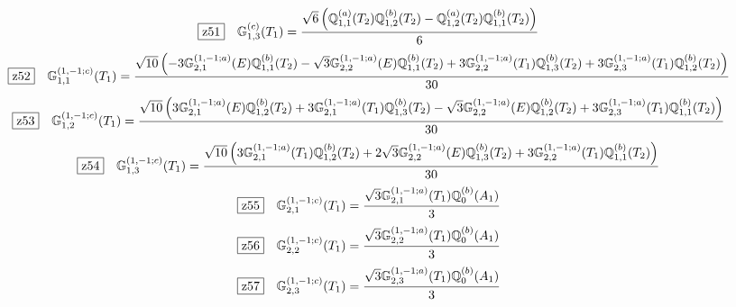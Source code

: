 \documentclass[fleqn,10pt,landscape]{jsarticle}
\begin{document}
\begin{dmath*}
\hspace*{3mm}\fbox{z51}\quad \mathbb{G}_{1,3}^{(c)}(T_{1})=\frac{\sqrt{6} \left(\mathbb{Q}_{1,1}^{(a)}(T_{2}) \mathbb{Q}_{1,2}^{(b)}(T_{2}) - \mathbb{Q}_{1,2}^{(a)}(T_{2}) \mathbb{Q}_{1,1}^{(b)}(T_{2})\right)}{6}
\end{dmath*}
\begin{dmath*}
\hspace*{3mm}\fbox{z52}\quad \mathbb{G}_{1,1}^{(1,-1;c)}(T_{1})=\frac{\sqrt{10} \left(- 3 \mathbb{G}_{2,1}^{(1,-1;a)}(E) \mathbb{Q}_{1,1}^{(b)}(T_{2}) - \sqrt{3} \mathbb{G}_{2,2}^{(1,-1;a)}(E) \mathbb{Q}_{1,1}^{(b)}(T_{2}) + 3 \mathbb{G}_{2,2}^{(1,-1;a)}(T_{1}) \mathbb{Q}_{1,3}^{(b)}(T_{2}) + 3 \mathbb{G}_{2,3}^{(1,-1;a)}(T_{1}) \mathbb{Q}_{1,2}^{(b)}(T_{2})\right)}{30}
\end{dmath*}
\begin{dmath*}
\hspace*{3mm}\fbox{z53}\quad \mathbb{G}_{1,2}^{(1,-1;c)}(T_{1})=\frac{\sqrt{10} \left(3 \mathbb{G}_{2,1}^{(1,-1;a)}(E) \mathbb{Q}_{1,2}^{(b)}(T_{2}) + 3 \mathbb{G}_{2,1}^{(1,-1;a)}(T_{1}) \mathbb{Q}_{1,3}^{(b)}(T_{2}) - \sqrt{3} \mathbb{G}_{2,2}^{(1,-1;a)}(E) \mathbb{Q}_{1,2}^{(b)}(T_{2}) + 3 \mathbb{G}_{2,3}^{(1,-1;a)}(T_{1}) \mathbb{Q}_{1,1}^{(b)}(T_{2})\right)}{30}
\end{dmath*}
\begin{dmath*}
\hspace*{3mm}\fbox{z54}\quad \mathbb{G}_{1,3}^{(1,-1;c)}(T_{1})=\frac{\sqrt{10} \left(3 \mathbb{G}_{2,1}^{(1,-1;a)}(T_{1}) \mathbb{Q}_{1,2}^{(b)}(T_{2}) + 2 \sqrt{3} \mathbb{G}_{2,2}^{(1,-1;a)}(E) \mathbb{Q}_{1,3}^{(b)}(T_{2}) + 3 \mathbb{G}_{2,2}^{(1,-1;a)}(T_{1}) \mathbb{Q}_{1,1}^{(b)}(T_{2})\right)}{30}
\end{dmath*}
\begin{dmath*}
\hspace*{3mm}\fbox{z55}\quad \mathbb{G}_{2,1}^{(1,-1;c)}(T_{1})=\frac{\sqrt{3} \mathbb{G}_{2,1}^{(1,-1;a)}(T_{1}) \mathbb{Q}_{0}^{(b)}(A_{1})}{3}
\end{dmath*}
\begin{dmath*}
\hspace*{3mm}\fbox{z56}\quad \mathbb{G}_{2,2}^{(1,-1;c)}(T_{1})=\frac{\sqrt{3} \mathbb{G}_{2,2}^{(1,-1;a)}(T_{1}) \mathbb{Q}_{0}^{(b)}(A_{1})}{3}
\end{dmath*}
\begin{dmath*}
\hspace*{3mm}\fbox{z57}\quad \mathbb{G}_{2,3}^{(1,-1;c)}(T_{1})=\frac{\sqrt{3} \mathbb{G}_{2,3}^{(1,-1;a)}(T_{1}) \mathbb{Q}_{0}^{(b)}(A_{1})}{3}
\end{dmath*}
\end{document}
